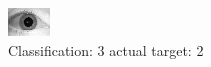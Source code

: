 \begin{figure}[h!]
\begin{center}
\includegraphics[width=0.60\columnwidth]{figures/ID1624_class_3_target_2.png}
\end{center}
\caption{ Classification: 3 actual target: 2}
\label{fig:ID1624_class_3_target_2}
\end{figure}
